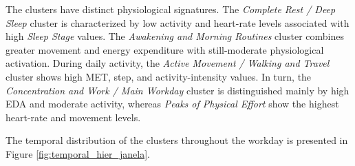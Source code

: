 \documentclass[a4paper,fleqn]{cas-sc}
\begin{document}
\begin{center}
\label{tab:percentis_hier_janela}
\renewcommand{\arraystretch}{1.4}
\end{center}

The clusters have distinct physiological signatures. The \textit{Complete Rest / Deep Sleep} cluster is characterized by low activity and heart-rate levels associated with high \textit{Sleep Stage} values. The \textit{Awakening and Morning Routines} cluster combines greater movement and energy expenditure with still-moderate physiological activation. During daily activity, the \textit{Active Movement / Walking and Travel} cluster shows high MET, step, and activity-intensity values. In turn, the \textit{Concentration and Work / Main Workday} cluster is distinguished mainly by high EDA and moderate activity, whereas \textit{Peaks of Physical Effort} show the highest heart-rate and movement levels.

The temporal distribution of the clusters throughout the workday is presented in Figure \ref{fig:temporal_hier_janela}.
\end{document}
